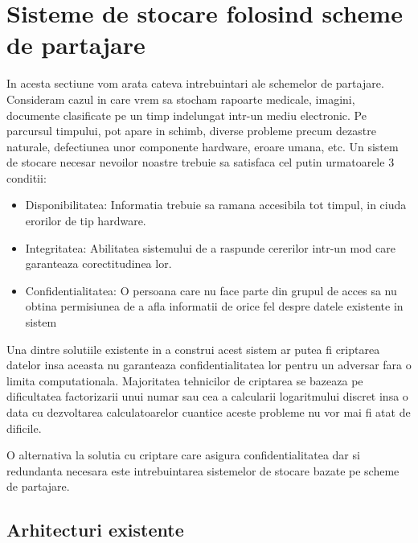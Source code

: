 \documentclass{llncs}
\begin{document}
\section{Sisteme de stocare folosind scheme de partajare}

In acesta sectiune vom arata cateva intrebuintari ale schemelor de partajare. Consideram cazul in care vrem sa stocham rapoarte medicale, imagini, documente clasificate pe un timp indelungat intr-un mediu electronic. Pe parcursul timpului, pot apare in schimb, diverse probleme precum dezastre naturale, defectiunea unor componente hardware, eroare umana, etc. \cite{SGMV:2009}
Un sistem de stocare necesar nevoilor noastre trebuie sa satisfaca cel putin urmatoarele 3 conditii:
\begin{itemize}
	\item Disponibilitatea: Informatia trebuie sa ramana accesibila tot timpul, in ciuda erorilor de tip hardware.
	\item Integritatea: Abilitatea sistemului de a raspunde cererilor intr-un mod care garanteaza corectitudinea lor.
	\item Confidentialitatea: O persoana care nu face parte din grupul de acces sa nu obtina permisiunea de a afla informatii de orice fel despre datele existente in sistem
\end{itemize}

Una dintre solutiile existente in a construi acest sistem ar putea fi criptarea datelor insa aceasta nu garanteaza confidentialitatea lor pentru un adversar fara o limita computationala. Majoritatea tehnicilor de criptarea se bazeaza pe dificultatea factorizarii unui numar sau cea a calcularii logaritmului discret insa o data cu dezvoltarea calculatoarelor cuantice aceste probleme nu vor mai fi atat de dificile. \cite{Shor:1994}

O alternativa la solutia cu criptare care asigura confidentialitatea dar si redundanta necesara este intrebuintarea sistemelor de stocare bazate pe scheme de partajare. \cite{W:2000,SB:2005,SGMV:2009}

\subsection{Arhitecturi existente}
\end{document}
